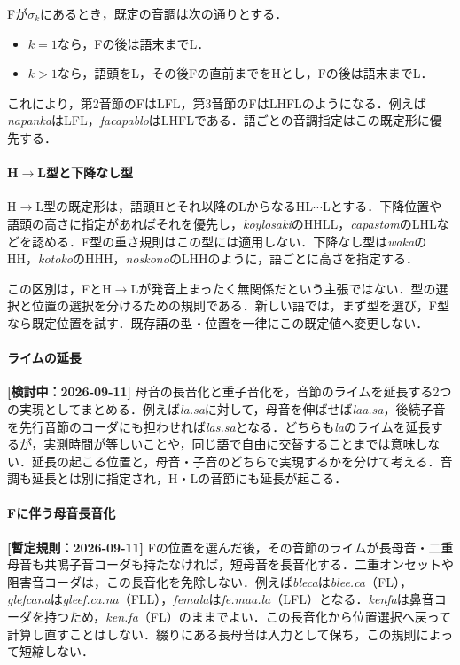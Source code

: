 \documentclass[../../main-detail.tex]{subfiles}
\begin{document}
\begin{definition}[F型の音調]
Fが$\sigma_k$にあるとき，既定の音調は次の通りとする．
\begin{itemize}
    \item $k=1$なら，Fの後は語末までL．
    \item $k>1$なら，語頭をL，その後Fの直前までをHとし，Fの後は語末までL．
\end{itemize}
\end{definition}
これにより，第2音節のFはLFL，第3音節のFはLHFLのようになる．例えば\textit{napanka}はLFL，\textit{facapablo}はLHFLである．語ごとの音調指定はこの既定形に優先する．

\paragraph{H$\to$L型と下降なし型}
H$\to$L型の既定形は，語頭Hとそれ以降のLからなるHL$\cdots$Lとする．下降位置や語頭の高さに指定があればそれを優先し，\textit{koylosaki}のHHLL，\textit{capastom}のLHLなどを認める．F型の重さ規則はこの型には適用しない．下降なし型は\textit{waka}のHH，\textit{kotoko}のHHH，\textit{noskono}のLHHのように，語ごとに高さを指定する．
\begin{remark}
この区別は，FとH$\to$Lが発音上まったく無関係だという主張ではない．型の選択と位置の選択を分けるための規則である．新しい語では，まず型を選び，F型なら既定位置を試す．既存語の型・位置を一律にこの既定値へ変更しない．
\end{remark}

\paragraph{ライムの延長}\label{phonology-lengthening}
\textbf{[検討中：2026-09-11]} 母音の長音化と重子音化を，音節のライムを延長する2つの実現としてまとめる．例えば\textit{la.sa}に対して，母音を伸ばせば\textit{laa.sa}，後続子音を先行音節のコーダにも担わせれば\textit{las.sa}となる．どちらも\textit{la}のライムを延長するが，実測時間が等しいことや，同じ語で自由に交替することまでは意味しない．延長の起こる位置と，母音・子音のどちらで実現するかを分けて考える．音調も延長とは別に指定され，H・Lの音節にも延長が起こる．

\paragraph{Fに伴う母音長音化}
\textbf{[暫定規則：2026-09-11]} Fの位置を選んだ後，その音節のライムが長母音・二重母音も共鳴子音コーダも持たなければ，短母音を長音化する．二重オンセットや阻害音コーダは，この長音化を免除しない．例えば\textit{bleca}は\textit{blee.ca}（FL），\textit{glefcana}は\textit{gleef.ca.na}（FLL），\textit{femala}は\textit{fe.maa.la}（LFL）となる．\textit{kenfa}は鼻音コーダを持つため，\textit{ken.fa}（FL）のままでよい．この長音化から位置選択へ戻って計算し直すことはしない．綴りにある長母音は入力として保ち，この規則によって短縮しない．
\end{document}
